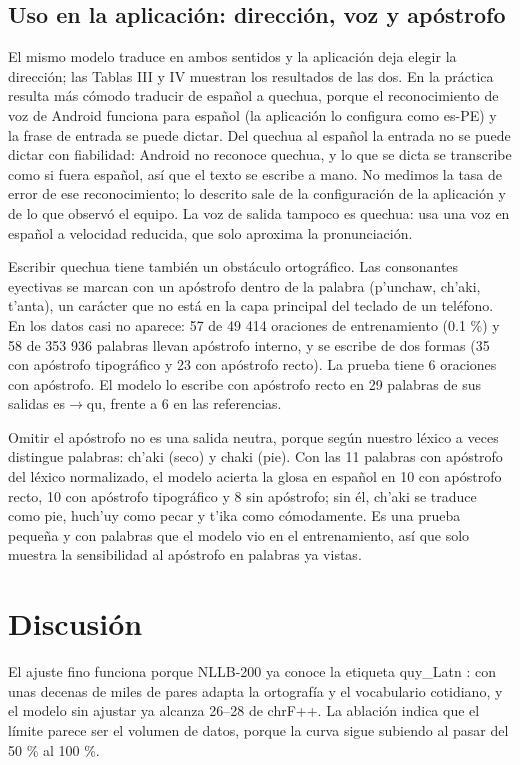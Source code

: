 \documentclass[conference]{IEEEtran}
\begin{document}
\subsection{Uso en la aplicación: dirección, voz y apóstrofo}
El mismo modelo traduce en ambos sentidos y la aplicación deja elegir la dirección; las Tablas III y IV muestran los resultados de las dos. En la práctica resulta más cómodo traducir de español a quechua, porque el reconocimiento de voz de Android funciona para español (la aplicación lo configura como es-PE) y la frase de entrada se puede dictar. Del quechua al español la entrada no se puede dictar con fiabilidad: Android no reconoce quechua, y lo que se dicta se transcribe como si fuera español, así que el texto se escribe a mano. No medimos la tasa de error de ese reconocimiento; lo descrito sale de la configuración de la aplicación y de lo que observó el equipo. La voz de salida tampoco es quechua: usa una voz en español a velocidad reducida, que solo aproxima la pronunciación.

Escribir quechua tiene también un obstáculo ortográfico. Las consonantes eyectivas se marcan con un apóstrofo dentro de la palabra (p'unchaw, ch'aki, t'anta), un carácter que no está en la capa principal del teclado de un teléfono. En los datos casi no aparece: 57 de 49 414 oraciones de entrenamiento (0.1 \%) y 58 de 353 936 palabras llevan apóstrofo interno, y se escribe de dos formas (35 con apóstrofo tipográfico y 23 con apóstrofo recto). La prueba tiene 6 oraciones con apóstrofo. El modelo lo escribe con apóstrofo recto en 29 palabras de sus salidas es$\rightarrow$qu, frente a 6 en las referencias.

Omitir el apóstrofo no es una salida neutra, porque según nuestro léxico a veces distingue palabras: ch'aki (seco) y chaki (pie). Con las 11 palabras con apóstrofo del léxico normalizado, el modelo acierta la glosa en español en 10 con apóstrofo recto, 10 con apóstrofo tipográfico y 8 sin apóstrofo; sin él, ch'aki se traduce como pie, huch'uy como pecar y t'ika como cómodamente. Es una prueba pequeña y con palabras que el modelo vio en el entrenamiento, así que solo muestra la sensibilidad al apóstrofo en palabras ya vistas.

\section{Discusión}
El ajuste fino funciona porque NLLB-200 ya conoce la etiqueta quy\_Latn \cite{r1}: con unas decenas de miles de pares adapta la ortografía y el vocabulario cotidiano, y el modelo sin ajustar ya alcanza 26–28 de chrF++. La ablación indica que el límite parece ser el volumen de datos, porque la curva sigue subiendo al pasar del 50 \% al 100 \%.
\end{document}
